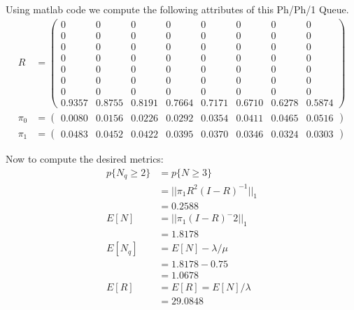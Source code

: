 \documentclass[fleqn]{article}
\newcommand{\mm}[1]{\begin{pmatrix}#1\end{pmatrix}}
\newcommand{\nn}[1]{ \begin{align*}#1\end{align*}}
\begin{document}
Using matlab code we compute the following attributes of this Ph/Ph/1 Queue. 
\nn{
	R &= \mm{
	  0 &       0 &       0 &       0 &       0 &       0 &       0 &       0\\
      0 &       0 &       0 &       0 &       0 &       0 &       0 &       0\\
      0 &       0 &       0 &       0 &       0 &       0 &       0 &       0\\
      0 &       0 &       0 &       0 &       0 &       0 &       0 &       0\\
      0 &       0 &       0 &       0 &       0 &       0 &       0 &       0\\
      0 &       0 &       0 &       0 &       0 &       0 &       0 &       0\\
      0 &       0 &       0 &       0 &       0 &       0 &       0 &       0\\
 0.9357 &  0.8755 &  0.8191 &  0.7664 &  0.7171 &  0.6710 &  0.6278 & 0.5874
  }\\
  \pi_0 &=\mm{0.0080 &  0.0156&   0.0226 &  0.0292 &  0.0354& 0.0411& 0.0465& 0.0516}\\
  \pi_1 &=\mm{0.0483& 0.0452& 0.0422& 0.0395& 0.0370& 0.0346& 0.0324 &0.0303 }
}

Now to compute the desired metrics: \\
\nn{
	p\{N_q \geq 2\} &= p\{N \geq 3\} \\
					&= || \pi_1 R^{2}(I-R)^{-1}||_1\\
					&= \boxed{0.2588}\\
	E[N] 			&= ||\pi_1(I-R)^-2||_1\\
					&= \boxed{1.8178}\\
	E[N_q]			&= E[N] - \lambda/\mu\\
					&= 1.8178 - 0.75\\
					&= 1.0678\\
	E[R]			&= E[R] = E[N]/\lambda \\
					&= \boxed{29.0848}
}
\end{document}
